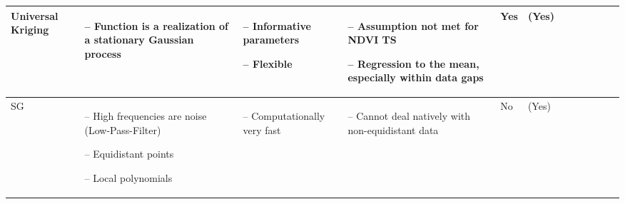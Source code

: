 \begin{table}[!ht]
\begin{tabular}{p{1.6cm}p{3.3cm}p{3.3cm}p{3.4cm}p{0.4cm}p{0.4cm}p{3cm}p{3cm}p{3cm}p{3cm}p{2.7cm}p{3cm}|}
		Universal Kriging                                                                                                                                            &
		\begin{cptitemize} \item[--]  Function is a realization of a stationary Gaussian process                                      \end{cptitemize}               &
		\begin{cptitemize} \item[--]  Informative parameters \item[--]  Flexible                                                             \end{cptitemize}        &
		\begin{cptitemize} \item[--]  Assumption not met for NDVI TS \item[--] Regression to the mean, especially within data gaps          \end{cptitemize}        &
		Yes                                                                                                                                                          &
		(Yes)                \\ \hline%

		SG                                                                                                                                        &
		\begin{cptitemize}
			\item[--]  High frequencies are noise (Low-Pass-Filter) \item[--]  Equidistant points \item[--]  Local polynomials\end{cptitemize}                                              &
		\begin{cptitemize} \item[--]  Computationally very fast                                                                   \end{cptitemize}                   &
		\begin{cptitemize} \item[--]  Cannot deal natively with non-equidistant data                             \end{cptitemize}                 &
		No                                                                                                                                                           &
		(Yes)                                                                                                                                                         \\ \hline%


\end{tabular}
\end{table}
